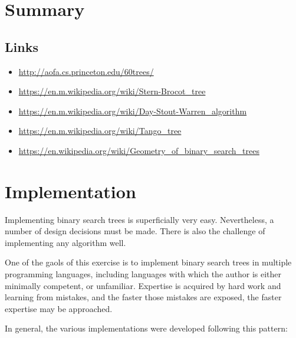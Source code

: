 \documentclass{article}
\begin{document}
\section{Summary}


\subsection{Links}

\begin{itemize}
\item \href{http://aofa.cs.princeton.edu/60trees/}{http://aofa.cs.princeton.edu/60trees/}
\item \href{https://en.m.wikipedia.org/wiki/Stern-Brocot\_tree}{https://en.m.wikipedia.org/wiki/Stern-Brocot\_tree}
\item \href{https://en.m.wikipedia.org/wiki/Day-Stout-Warren\_algorithm}{%
https://en.m.wikipedia.org/wiki/Day-Stout-Warren\_algorithm}
\item \href{https://en.m.wikipedia.org/wiki/Tango\_tree}{https://en.m.wikipedia.org/wiki/Tango\_tree}
\item \href{https://en.wikipedia.org/wiki/Geometry\_of\_binary\_search\_trees}{%
https://en.wikipedia.org/wiki/Geometry\_of\_binary\_search\_trees}
\end{itemize}



{}



\appendix

\section{Implementation}

Implementing binary search trees is superficially very easy. Nevertheless,
a number of design decisions must be made. There is also the challenge of
implementing any algorithm well.

One of the gaols of this exercise is to implement binary search trees in multiple
programming languages, including languages with which the author is either
minimally competent, or unfamiliar. Expertise is acquired by hard work and
learning from mistakes, and the faster those mistakes are exposed, the
faster expertise may be approached.

In general, the various implementations were developed following this
pattern:
\end{document}
